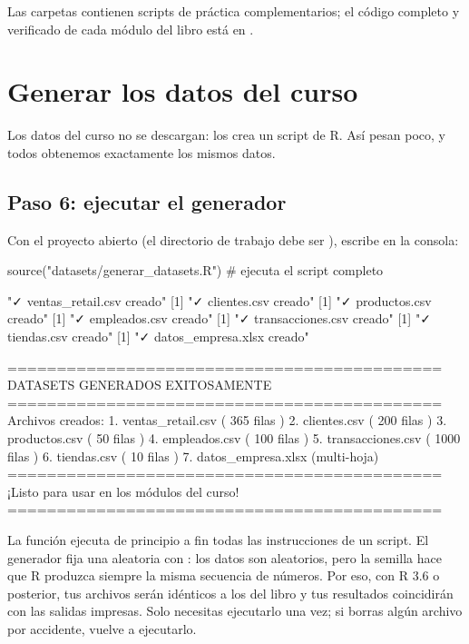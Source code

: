 Las carpetas  contienen scripts de práctica
complementarios; el código completo y verificado de cada módulo del libro
está en .

\section{Generar los datos del curso}
\label{sec:m0-generar}

Los datos del curso no se descargan: los crea un script de R. Así pesan
poco, y todos obtenemos exactamente los mismos datos.

\subsection{Paso 6: ejecutar el generador}

Con el proyecto abierto (el directorio de trabajo debe ser
), escribe en la consola:

\begin{rcode}
source("datasets/generar_datasets.R")   # ejecuta el script completo
\end{rcode}

\begin{rsalida}
[1] "✓ ventas_retail.csv creado"
[1] "✓ clientes.csv creado"
[1] "✓ productos.csv creado"
[1] "✓ empleados.csv creado"
[1] "✓ transacciones.csv creado"
[1] "✓ tiendas.csv creado"
[1] "✓ datos_empresa.xlsx creado"

============================================
  DATASETS GENERADOS EXITOSAMENTE
============================================
Archivos creados:
  1. ventas_retail.csv ( 365 filas )
  2. clientes.csv ( 200 filas )
  3. productos.csv ( 50 filas )
  4. empleados.csv ( 100 filas )
  5. transacciones.csv ( 1000 filas )
  6. tiendas.csv ( 10 filas )
  7. datos_empresa.xlsx (multi-hoja)
============================================
¡Listo para usar en los módulos del curso!
============================================
\end{rsalida}

La función  ejecuta de principio a fin todas las
instrucciones de un script. El generador fija una 
aleatoria con : los datos son aleatorios, pero la
semilla hace que R produzca siempre la misma secuencia de números. Por eso,
con R 3.6 o posterior, tus archivos serán idénticos a los del libro y tus
resultados coincidirán con las salidas impresas. Solo necesitas ejecutarlo
una vez; si borras algún archivo por accidente, vuelve a ejecutarlo.

